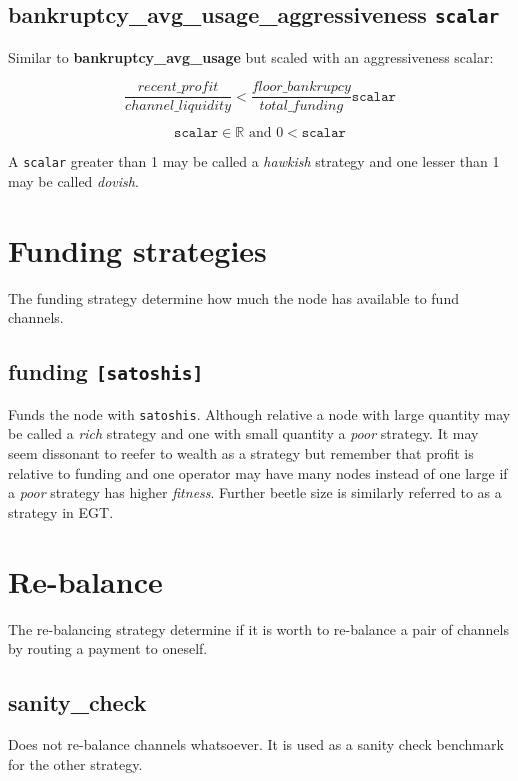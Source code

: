 \subsection*{bankruptcy\_avg\_usage\_aggressiveness \texttt{scalar}}

Similar to \textbf{bankruptcy\_avg\_usage} but scaled with an aggressiveness scalar:

\[ \frac{recent\_profit}{channel\_liquidity} < \frac{floor\_bankrupcy}{total\_funding} \texttt{scalar} \]

\[ \texttt{scalar} \in \mathbb{R} \text{ and } 0 < \texttt{scalar}  \]

A \texttt{scalar} greater than 1 may be called a \textit{hawkish} strategy and one lesser than 1 may be called \textit{dovish}.

\section*{Funding strategies}

The funding strategy determine how much the node has available to fund channels.

\subsection*{funding \texttt{[satoshis]}}

Funds the node with \texttt{satoshis}. Although relative a node with large quantity may be called a \textit{rich} strategy and
one with small quantity a \textit{poor} strategy. It may seem dissonant to reefer to wealth as a strategy but remember 
that profit is relative to funding and one operator may have many nodes instead of one large if a \textit{poor} strategy
has higher \textit{fitness}. Further beetle size is similarly referred to as a strategy in EGT.


\section*{Re-balance}

The re-balancing strategy determine if it is worth to re-balance a pair of channels by routing a payment to oneself.

\subsection*{sanity\_check}

Does not re-balance channels whatsoever. It is used as a sanity check benchmark for the other strategy.

